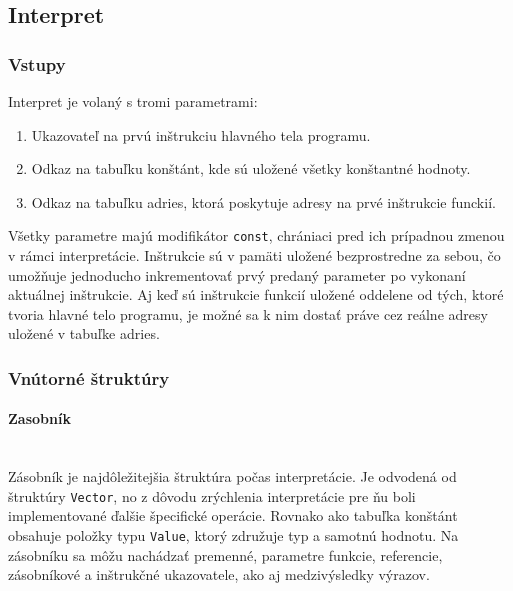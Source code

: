 \documentclass[12pt,a4paper,titlepage,final]{article}
\begin{document}
\subsection{Interpret}

\subsubsection{Vstupy}
Interpret je volaný s tromi parametrami:
\begin{enumerate}
    \itemsep0em
    \item Ukazovateľ na prvú inštrukciu hlavného tela programu.
    \item Odkaz na tabuľku konštánt, kde sú uložené všetky konštantné hodnoty.
    \item Odkaz na tabuľku adries, ktorá poskytuje adresy na prvé inštrukcie funckií.
\end{enumerate}
Všetky parametre majú modifikátor \texttt{const}, chrániaci pred ich prípadnou zmenou
v rámci interpretácie. Inštrukcie sú v pamäti uložené bezprostredne za sebou, čo
umožňuje jednoducho inkrementovať prvý predaný parameter po vykonaní aktuálnej
inštrukcie. Aj keď sú inštrukcie funkcií uložené oddelene od tých, ktoré tvoria hlavné
telo programu, je možné sa k nim dostať práve cez reálne adresy uložené v tabuľke adries.

\subsubsection{Vnútorné štruktúry}

\paragraph{Zasobník}\mbox{}\\

Zásobník je najdôležitejšia štruktúra počas interpretácie. Je odvodená od štruktúry
\texttt{Vector}, no z dôvodu zrýchlenia interpretácie pre ňu boli implementované ďalšie
špecifické operácie. Rovnako ako tabuľka konštánt obsahuje položky typu \texttt{Value}, 
ktorý združuje typ a samotnú hodnotu. Na zásobníku sa môžu nachádzať premenné, parametre
funkcie, referencie, zásobníkové a inštrukčné ukazovatele, ako aj medzivýsledky výrazov.
\end{document}
